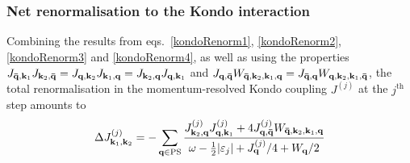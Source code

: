 \documentclass[reprint,hidelinks]{revtex4-2}
\begin{document}
\begin{widetext}
\subsubsection*{Net renormalisation to the Kondo interaction}
Combining the results from eqs.~\ref{kondoRenorm1}, \ref{kondoRenorm2}, \ref{kondoRenorm3} and \ref{kondoRenorm4}, as well as using the properties \(J_{{\bf \bar q}, {\bf k}_1} J_{{\bf k}_2,{\bf \bar q}} = J_{{\bf q}, {\bf k}_2} J_{{\bf k}_1,{\bf q}} = J_{{\bf k}_2, {\bf q}} J_{{\bf q},{\bf k}_1}\) and \(J_{{\bf q}, {\bf \bar q}} W_{{\bf \bar q}, {\bf k}_2, {\bf k}_1, {\bf q}} = J_{{\bf \bar q}, {\bf q}} W_{{\bf q}, {\bf k}_2, {\bf k}_1, {\bf \bar q}}\), the total renormalisation in the momentum-resolved Kondo coupling \(J^{(j)}\) at the \(j^\text{th}\) step amounts to
\begin{equation}\begin{aligned}
	\Delta J^{(j)}_{{\bf k}_1, {\bf k}_2} = -\sum_{{\bf q} \in \text{PS}} \frac{J^{(j)}_{{\bf k}_2,{\bf q}} J^{(j)}_{{\bf q},{\bf k}_1} + 4J^{(j)}_{{\bf q}, {\bf \bar q}} W_{{\bf \bar q}, {\bf k}_2, {\bf k}_1, {\bf q}}}{\omega - \frac{1}{2}|\varepsilon_j| + J^{(j)}_{{\bf q}}/4 + W_{{\bf q}}/2}
\end{aligned}\end{equation}

\end{widetext}

\end{document}
